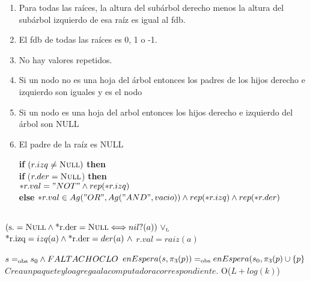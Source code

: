 \begin{enumerate}
	\item Para todas las raíces, la altura del subárbol derecho menos la altura del subárbol izquierdo de esa raíz es igual al fdb.
	\item El fdb de todas las raíces es 0, 1 o -1.
	\item No hay valores repetidos.
	\item Si un nodo no es una hoja del árbol entonces los padres de los hijos derecho e izquierdo son iguales y es el nodo
	\item Si un nodo es una hoja del arbol entonces los hijos derecho e izquierdo del árbol son NULL
	\item El padre de la raíz es NULL

		 \textbf{if} $(r.izq \neq \textsc{Null})$ \textbf{then} \\
		\textbf{if} ($r.der = \textsc{Null}$) \textbf{then} \\
		$*r.val = "NOT" \land rep(*r.izq)$ \\
		\textbf{else} $*r.val \in Ag("OR", Ag("AND",vacio)) \land rep(*r.izq) \land rep(*r.der)$
		\end{enumerate}


  \\
 $(\text{\normalfont s.} = \textsc{Null} \land \text{\normalfont*r.der} = \textsc{Null} \Longleftrightarrow nil?(a)) \ \lor_{\mathrm{\scriptscriptstyle{L}}}$ \\
 $\text{\normalfont*r.izq} = izq(a) \land \text{\normalfont*r.der} = der(a) \ \land$
 $r.val = raiz(a) $




 {$s =_{\mathrm{obs}} s_0 \land FALTA CHOCLO$}
 {$enEspera(s,\pi_3(p)) =_{\mathrm{obs}} enEspera(s_0,\pi_3(p) \cup \{p\}$}
 {$Crea un paquete y lo agrega a la computadora correspondiente.$}
 {O($L + log(k)$)}


